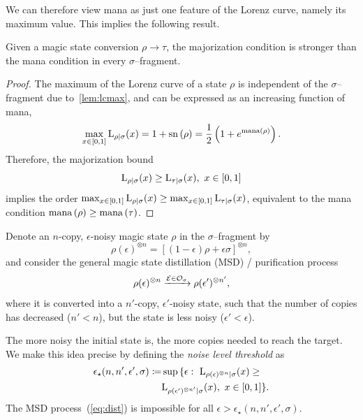 \documentclass[pra,
aps,
twocolumn,
superscriptaddress,
groupedaddress,
nofootinbib,
reprint
]{revtex4-1}
\begin{document}
We can therefore view mana as just one feature of the Lorenz curve, namely its maximum value. 
This implies the following result.
\begin{theorem}\label{thm:bounds}
    Given a magic state conversion $\rho \longrightarrow \tau$, the majorization condition is stronger than the mana condition in every $\sigma$--fragment.
\end{theorem}
\begin{proof}
    The maximum of the Lorenz curve of a state $\rho$ is independent of the $\sigma$--fragment due to~\cref{lem:lcmax}, and can be expressed as an increasing function of mana,
    \begin{equation}
        \max_{x\in[0,1]}{{{\rm{L}}_{\rho|\sigma}}(x)} = 1 + {{\rm{sn}}\left(\rho\right)} = \frac{1}{2} \left( 1 + e^{{\rm{mana}}\left(\rho\right)} \right).
    \end{equation}
    Therefore, the majorization bound
    \begin{equation}
    	\lc{\rho}{\sigma}(x) \geq \lc{\tau}{\sigma}(x),\ x\in[0,1]
    \end{equation}
    implies the order $\max_{x\in[0,1]}{{{\rm{L}}_{\rho|\sigma}}(x)} \geq \max_{x\in[0,1]}{{{\rm{L}}_{\tau|\sigma}}(x)}$, equivalent to the mana condition ${{\rm{mana}}\left(\rho\right)} \geq {{\rm{mana}}\left(\tau\right)}$.
\end{proof}

Denote an $n$-copy, $\epsilon$-noisy magic state $\rho$ in the $\sigma$--fragment by
\begin{equation}\label{eq:dist}
    \rho(\epsilon)^{\otimes n} = \left[ (1 - \epsilon) \rho + \epsilon \sigma \right]^{\otimes n},
\end{equation}
and consider the general magic state distillation (MSD) / purification process
\begin{equation}
		\rho(\epsilon)^{\otimes n} \xrightarrow{\mathcal{E} \in \mathcal{O}_\sigma} \rho(\epsilon')^{\otimes n'},
\end{equation}
where it is converted into a $n'$-copy, $\epsilon'$-noisy state, such that the number of copies has decreased ($n' < n$), but the state is less noisy ($\epsilon' < \epsilon$).

The more noisy the initial state is, the more copies needed to reach the target. 
We make this idea precise by defining the \emph{noise level threshold} as
\begin{equation}\label{eq:ethresh}
	\begin{split}
	\epsilon_{\star}(n, n', \epsilon', \sigma) \coloneqq &\sup{\{\epsilon:\  {{\rm{L}}_{\rho(\epsilon)^{\otimes n}|\sigma}} }(x) \geq \\
	&{{{\rm{L}}_{\rho(\epsilon')^{\otimes n'}|\sigma}}(x),\ x\in[0,1]\}}.
	\end{split}
\end{equation}
The MSD process~(\ref{eq:dist}) is impossible for all $\epsilon > \epsilon_{\star}(n, n', \epsilon', \sigma)$.
\end{document}
